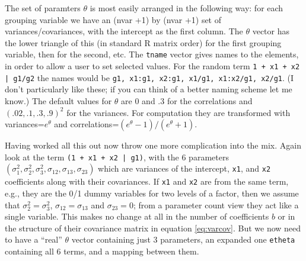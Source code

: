 \documentclass{article}
\begin{document}
The set of paramters $\theta$ is most easily arranged in the
following way:
for each grouping variable we have an 
(nvar +1) by (nvar +1) set of variances/covariances, with the
intercept as the first column.
The $\theta$ vector has the lower triangle of this (in standard R
matrix order) for the first grouping variable, then for the second, 
etc.
The \Verb!tname! vector gives names to the elements, in
order to allow a user to set selected values.
For the random term \Verb!1 + x1 + x2 | g1/g2! the names would be
\Verb!g1, x1:g1, x2:g1, x1/g1, x1:x2/g1, x2/g1!. 
(I don't particularly like these;  %
if you can think of a better naming scheme let me know.)
The default values for $\theta$ are 0 and .3 for the correlations and 
$(.02, .1, .3, .9)^2$ for the variances.
For computation they are transformed with variances=$e^\theta$ and
correlations=$(e^\theta -1)/(e^\theta +1)$.

Having worked all this out now throw one more complication into the mix. 
Again look at the term \Verb!(1 + x1 + x2 | g1)!, with the 6 parameters
$(\sigma_1^2, \sigma_2^2, \sigma_3^2, \sigma_{12}, \sigma_{13}, \sigma_{23})$
which are variances of the intercept, \Verb!x1!, and \Verb?x2? coefficients along
with their covariances.  
If \Verb!x1! and \Verb?x2? are from the same term, e.g., they are the 0/1 dummy variables
for two levels of a factor, then we assume that $\sigma_2^2= \sigma_3^2$,
$\sigma_{12}=\sigma_{13}$ and $\sigma_{23}=0$; 
from a parameter count view they act like a single variable.
This makes no change at all in the number of coefficients $b$ or in the 
structure of their covariance matrix in equation \ref{eq:varcov}.
But we now need to have a ``real'' $\theta$ vector containing just 3 parameters,
an expanded one \Verb!etheta! containing all 6 terms, and a mapping between them.
\end{document}
